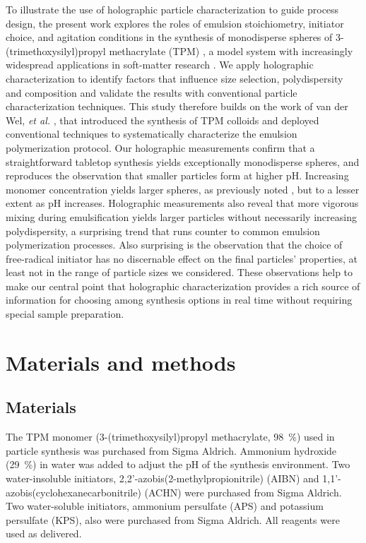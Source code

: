 \documentclass[journal=langd5,manuscript=article]{achemso}
\begin{document}
To illustrate the use of holographic particle characterization
to guide process design, the present work
explores the roles of emulsion stoichiometry, initiator choice, and
agitation conditions in the synthesis of monodisperse spheres of
3-(trimethoxysilyl)propyl methacrylate (TPM) \cite{vanderwel17},
a model system with increasingly widespread applications
in soft-matter research \cite{sacanna11,liu16,vanderwel18}.
We apply holographic characterization
to identify factors that influence size selection, polydispersity
and composition and validate the results with conventional particle
characterization techniques.
This study therefore builds on the work of van der Wel, \emph{et al.}
\cite{vanderwel17}, that introduced the synthesis of TPM colloids
and deployed conventional techniques to systematically
characterize the emulsion polymerization protocol.
Our holographic measurements confirm that a straightforward
tabletop synthesis yields exceptionally monodisperse spheres,
and reproduces the observation \cite{vanderwel17}
that smaller particles form at higher pH.
Increasing monomer concentration yields larger spheres,
as previously noted \cite{vanderwel17}, but to a lesser
extent as pH increases.
Holographic measurements also reveal that more vigorous
mixing during emulsification yields larger
particles without necessarily increasing polydispersity,
a surprising trend that runs counter to common
emulsion polymerization processes.
Also surprising is the observation that the
choice of free-radical initiator has no discernable
effect on the final particles' properties, at least not
in the range of particle sizes we considered.
These observations help to make our central point that holographic
characterization provides a rich source of information
for choosing among synthesis options in real time
without requiring special sample preparation.

\section{Materials and methods}
\label{sec:experimental}

\subsection{Materials}
\label{sec:materials}
The TPM monomer (3-(trimethoxysilyl)propyl methacrylate, \SI{98}{\percent})
used in particle synthesis was purchased from Sigma Aldrich. 
Ammonium hydroxide (\SI{29}{\percent}) in water was added to adjust
the pH of the synthesis environment.
Two water-insoluble initiators, 2,2'-azobis(2-methylpropionitrile) (AIBN)
and 1,1'-azobis(cyclohexanecarbonitrile) (ACHN)
were purchased from Sigma Aldrich.
Two water-soluble initiators, 
ammonium persulfate (APS) and potassium persulfate (KPS),
also were purchased from Sigma Aldrich.
All reagents were used as delivered.
\end{document}
